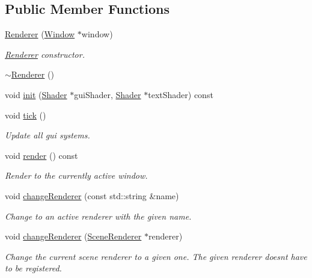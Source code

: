 \subsection*{Public Member Functions}
\begin{DoxyCompactItemize}
\item 
\mbox{\hyperlink{classec_1_1_renderer_a97bc5e3d5050aa98a24fec3669eab28b}{Renderer}} (\mbox{\hyperlink{classec_1_1_window}{Window}} $\ast$window)
\begin{DoxyCompactList}\small\item\em \mbox{\hyperlink{classec_1_1_renderer}{Renderer}} constructor. \end{DoxyCompactList}\item 
\mbox{\hyperlink{classec_1_1_renderer_ab0a97bd174127b670899477a576d1fe6}{$\sim$\+Renderer}} ()
\item 
void \mbox{\hyperlink{classec_1_1_renderer_acfa2ed0fd23f3f6e36de59302a0148ad}{init}} (\mbox{\hyperlink{classec_1_1_shader}{Shader}} $\ast$gui\+Shader, \mbox{\hyperlink{classec_1_1_shader}{Shader}} $\ast$text\+Shader) const
\item 
void \mbox{\hyperlink{classec_1_1_renderer_a6dcc619251e6e4ec7f088567cba6fd57}{tick}} ()
\begin{DoxyCompactList}\small\item\em Update all gui systems. \end{DoxyCompactList}\item 
void \mbox{\hyperlink{classec_1_1_renderer_a7ff2c9444ad5da2a6db3331f19cb12f9}{render}} () const
\begin{DoxyCompactList}\small\item\em Render to the currently active window. \end{DoxyCompactList}\item 
void \mbox{\hyperlink{classec_1_1_renderer_abb876cb59df2478b52926782e2d0a0a9}{change\+Renderer}} (const std\+::string \&name)
\begin{DoxyCompactList}\small\item\em Change to an active renderer with the given name. \end{DoxyCompactList}\item 
void \mbox{\hyperlink{classec_1_1_renderer_aff1e2f129ce6b24a5ed1e27730a13762}{change\+Renderer}} (\mbox{\hyperlink{classec_1_1_scene_renderer}{Scene\+Renderer}} $\ast$renderer)
\begin{DoxyCompactList}\small\item\em Change the current scene renderer to a given one. The given renderer doesn\textquotesingle{}t have to be registered. \end{DoxyCompactList}\item 

\end{DoxyCompactItemize}
